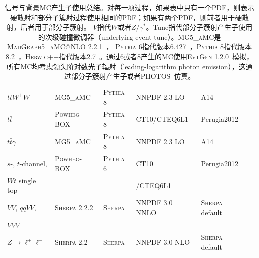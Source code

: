 \begin{table}
\begin{center}
{\begin{tabular}{llllll}
$t\bar t W^+ W^-$ & \textsc{MG5\_aMC} & \textsc{Pythia} 8 & NNPDF 2.3 LO & A14  \\
$t\bar{t}$ & \textsc{Powheg-BOX} \cite{powhegtt} & \textsc{Pythia} 8 & CT10/CTEQ6L1 & Perugia2012  \\
$t\bar{t}\gamma$ & \textsc{MG5\_aMC} & \textsc{Pythia} 8 & NNPDF 2.3 LO & A14  \\
$s$-, $t$-channel, & \textsc{Powheg-BOX} \cite{powhegstp,powhegstp2} & \textsc{Pythia} 6 & CT10 & Perugia2012   \\
 $Wt$ single top & & & /CTEQ6L1 \\
$VV$, $qqVV$, & \textsc{Sherpa} 2.2.2 \cite{sherpa} & \textsc{Sherpa} & NNPDF 3.0 NNLO & \textsc{Sherpa} default  \\
$VVV$ & & & \\
$Z \to \ell^+\ell^-$ & \textsc{Sherpa} 2.2 & \textsc{Sherpa} & NNPDF 3.0 NLO & \textsc{Sherpa} default \\
\hline\hline
\end{tabular}
}
\caption{\label{tab:mcconfig} 
信号与背景MC产生子使用总结。对每一项过程，如果表中只有一个PDF，则表示硬散射和部分子簇射过程使用相同的PDF；如果有两个PDF，则前者用于硬散射，后者用于部分子簇射。
$V$指代$W$或者$Z/\gamma^*$。Tune指代部分子簇射产生子使用的次级碰撞微调器（underlying-event tune）。\textsc{MG5\_aMC}是\textsc{MadGraph5\_aMC@NLO} 2.2.1~\cite{Alwall:2014hca}，
\textsc{Pythia} 6指代版本6.427~\cite{pythia6}，\textsc{Pythia} 8指代版本8.2~\cite{pythia8}，\textsc{Herwig++}指代版本2.7~\cite{Bahr:2008pv}。通过\PYTHIA 6或者\PYTHIA 8产生的MC使用\textsc{EvtGen} 1.2.0~\cite{Lange:2001uf}模拟，所有MC均考虑领头阶对数光子辐射（leading-logarithm photon emission），这通过部分子簇射产生子或者\textsc{PHOTOS}~\cite{Golonka:2005pn}仿真。
}
\end{center}
\end{table}

